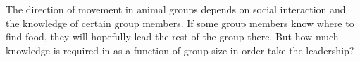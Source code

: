 The direction of movement in animal groups depends on social interaction and the knowledge of certain group members. If some group members know where to find food, they will hopefully lead the rest of the group there. But how much knowledge is required in as a function of group size in order take the leadership?